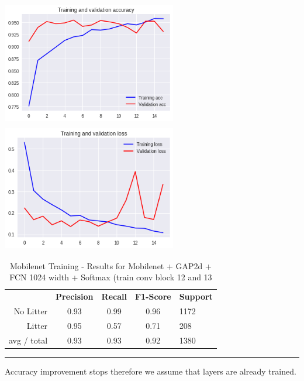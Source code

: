 \documentclass{IEEEtran}
\begin{document}
\includegraphics[width=3in,height=2.18in]{mobile/mobilenet-img015.png}
\includegraphics[width=3in,height=2.18in]{mobile/mobilenet-img016.png}


\begin{table}[ht]
\centering
\caption{Mobilenet Training - Results for Mobilenet + GAP2d + FCN 1024 width + Softmax (train conv block 12 and 13}
\label{mobilenet1}
\begin{tabular}{rcccl}
\textbf{}   & \textbf{Precision} & \textbf{Recall} & \textbf{F1-Score} & \textbf{Support} \\
No Litter   & 0.93 &0.99 & 0.96 & 1172 \\
Litter      & 0.95 &0.57 & 0.71 & 208 \\
avg / total & 0.93 &0.93 & 0.92 & 1380 \\
\end{tabular}
\begin{center}\noindent\rule{10cm}{0.4pt}\end{center}
\end{table}

Accuracy improvement stops therefore we assume that layers are already trained.
\cite{Alom2018TheApproaches}


\end{document}

